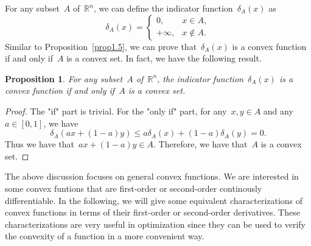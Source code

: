 \documentclass[12pt,a4paper,draft]{article}  %
\newtheorem{proposition}{Proposition}[section]
\theoremstyle{definition}
\numberwithin{equation}{section}
\newcommand{\RR}{\mathbb{R}}
\begin{document}
For any subset~$A$ of~$\RR^n$, we can define the indicator function~$\delta_A(x)$ as
\[ \delta_A(x) = \begin{cases}
    0, & x \in A, \\
    +\infty, & x \notin A.
\end{cases} 
\]
Similar to Proposition~\eqref{prop1.5}, we can prove that~$\delta_A(x)$ is a convex function if and only if~$A$ is a convex set. In fact, we have the following result.
\begin{proposition}
    For any subset~$A$ of~$\RR^n$, the indicator function~$\delta_A(x)$ is a convex function if and only if~$A$ is a convex set.
\end{proposition}
\begin{proof}
    The "if" part is trivial. For the "only if" part, for any~$x,y \in A$ and any~$a \in \left[ 0,1 \right]$, we have
    $$ \delta_A(ax+(1-a)y) \leq a \delta_A(x) + (1-a) \delta_A(y) = 0. $$
    Thus we have that~$ax+(1-a)y \in A$. Therefore, we have that~$A$ is a convex set.
\end{proof}

The above discussion focuses on general convex functions. We are interested in 
some convex funtions that are first-order or second-order continously differentiable.
In the following, we will give some equivalent characterizations of convex functions in terms of their first-order or second-order derivatives.
These characterizations are very useful in optimization since they can be used to verify the convexity of a function in a more convenient way.
\end{document}
